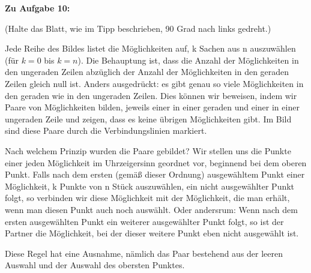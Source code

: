 \documentclass{article}
\begin{document}
\textbf{Zu Aufgabe 10:}

(Halte das Blatt, wie im Tipp beschrieben, 90 Grad nach links gedreht.)

Jede Reihe des Bildes listet die Möglichkeiten auf, k Sachen aus n auszuwählen (für $k=0$ bis $k=n$). Die Behauptung ist, dass die Anzahl der Möglichkeiten in den ungeraden Zeilen abzüglich der Anzahl der Möglichkeiten in den geraden Zeilen gleich null ist. Anders ausgedrückt: es gibt genau so viele Möglichkeiten in den geraden wie in den ungeraden Zeilen. Dies können wir beweisen, indem wir Paare von Möglichkeiten bilden, jeweils einer in einer geraden und einer in einer ungeraden Zeile und zeigen, dass es keine übrigen Möglichkeiten gibt. Im Bild sind diese Paare durch die Verbindungslinien markiert.

Nach welchem Prinzip wurden die Paare gebildet? Wir stellen uns die Punkte einer jeden Möglichkeit im Uhrzeigersinn geordnet vor, beginnend bei dem oberen Punkt. Falls nach dem ersten (gemäß dieser Ordnung) ausgewähltem Punkt einer Möglichkeit, k Punkte von n Stück auszuwählen, ein nicht ausgewählter Punkt folgt, so verbinden wir diese Möglichkeit mit der Möglichkeit, die man erhält, wenn man diesen Punkt auch noch auswählt.
Oder andersrum: Wenn nach dem ersten ausgewählten Punkt ein weiterer ausgewählter Punkt folgt, so ist der Partner die Möglichkeit, bei der dieser weitere Punkt eben nicht ausgewählt ist.

Diese Regel hat eine Ausnahme, nämlich das Paar bestehend aus der leeren Auswahl und der Auswahl des obersten Punktes.
\end{document}
